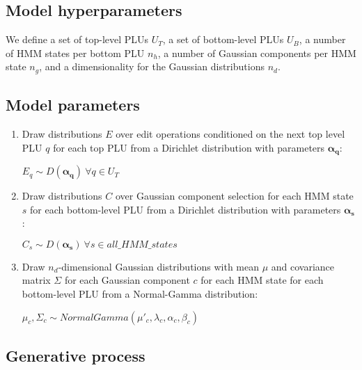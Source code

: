 \documentclass[11pt]{article}
\newcommand{\bs}{\boldsymbol}
\newcommand{\myindent}{\hspace{2cm}}
\begin{document}
\subsection{Model hyperparameters}

We define a set of top-level PLUs $U_T$, a set of bottom-level PLUs $U_B$, a number of HMM states per bottom PLU $n_h$, a number of Gaussian components per HMM state $n_g$, and a dimensionality for the Gaussian distributions $n_d$.

\subsection{Model parameters}

\begin{enumerate}

\item Draw distributions $E$ over edit operations conditioned on the next top level PLU $q$ for each top PLU from a Dirichlet distribution with parameters $\bs{\alpha_q}$:

\myindent $E_q \sim D(\bs{\alpha_{q}}) ~ \forall q \in U_T$

\item Draw distributions $C$ over Gaussian component selection for each HMM state $s$ for each bottom-level PLU from a Dirichlet distribution with parameters $\bs{\alpha_{s}}$:

\myindent $C_{s} \sim D(\bs{\alpha_{s}}) ~ \forall s \in all\_HMM\_states$

\item Draw $n_d$-dimensional Gaussian distributions with mean $\mu$ and covariance matrix $\Sigma$ for each Gaussian component $c$ for each HMM state for each bottom-level PLU from a Normal-Gamma distribution:

\myindent $\mu_c, \Sigma_c \sim NormalGamma(\mu'_c, \lambda_c, \alpha_c, \beta_c)$

\end{enumerate}

\subsection{Generative process}
\end{document}
